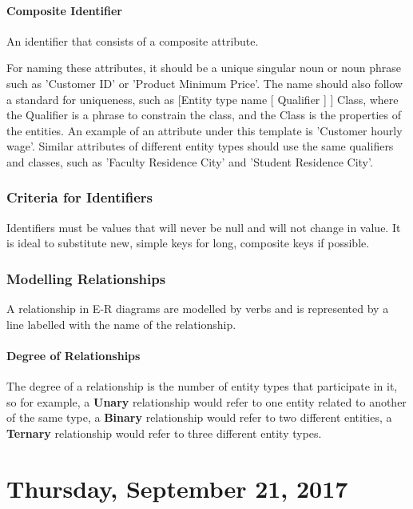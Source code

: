 \documentclass[12pt]{article}
\begin{document}
\paragraph{Composite Identifier} An identifier that consists of a composite attribute.

For naming these attributes, it should be a unique singular noun or noun phrase such as 'Customer ID' or 'Product Minimum Price'. The name should also follow a standard for uniqueness, such as [Entity type name { [ Qualifier ] }] Class, where the Qualifier is a phrase to constrain the class, and the Class is the properties of the entities. An example of an attribute under this template is 'Customer hourly wage'. Similar attributes of different entity types should use the same qualifiers and classes, such as 'Faculty Residence City' and 'Student Residence City'.

\subsubsection{Criteria for Identifiers}

Identifiers must be values that will never be null and will not change in value. It is ideal to substitute new, simple keys for long, composite keys if possible.

\subsubsection{Modelling Relationships}

A relationship in E-R diagrams are modelled by verbs and is represented by a line labelled with the name of the relationship.

\paragraph{Degree of Relationships} The degree of a relationship is the number of entity types  that participate in it, so for example, a \textbf{Unary} relationship would refer to one entity related to another of the same type, a \textbf{Binary} relationship would refer to two different entities, a \textbf{Ternary} relationship would refer to three different entity types.

\newpage

\section{Thursday, September 21, 2017}
\end{document}
